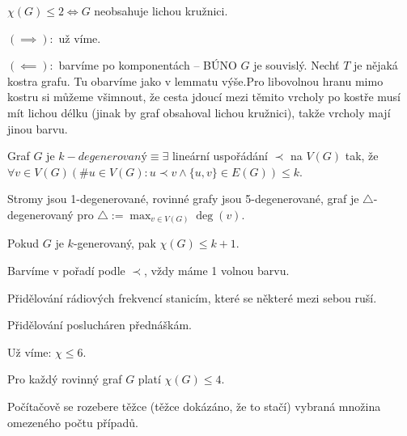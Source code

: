 \documentclass[12pt]{article}					%
\begin{document}
        \begin{veta}
            $\chi(G)≤2 \Leftrightarrow G$ neobsahuje lichou kružnici.
            \begin{dukazin}
                $(\implies):$ už víme.

                $(\impliedby):$ barvíme po komponentách -- BÚNO $G$ je souvislý. Nechť $T$ je nějaká kostra grafu. Tu obarvíme jako v lemmatu výše.Pro libovolnou hranu mimo kostru si můžeme všimnout, že cesta jdoucí mezi těmito vrcholy po kostře musí mít lichou délku (jinak by graf obsahoval lichou kružnici), takže vrcholy mají jinou barvu.
            \end{dukazin}
        \end{veta}

        \begin{definice}[Degenerovanost]
            Graf $G$ je $k-degenerovaný ≡ \exists$ lineární uspořádání $\prec$ na $V(G)$ tak, že $\forall v \in V(G) (\#u\in V(G): u \prec v \land \{u, v\} \in E(G)) ≤ k$.
        \end{definice}

        \begin{priklady}
                Stromy jsou 1-degenerované, rovinné grafy jsou 5-degenerované, graf je $\triangle$-degenerovaný pro $\triangle := \max_{v \in V(G)} \deg(v)$.
        \end{priklady}

        \begin{veta}[Větička]
            Pokud $G$ je $k$-generovaný, pak $\chi(G) ≤ k+1$.
            \begin{dukazin}
                Barvíme v pořadí podle $\prec$, vždy máme 1 volnou barvu.
            \end{dukazin}
        \end{veta}

        \begin{priklady}[Využití]
            Přidělování rádiových frekvencí stanicím, které se některé mezi sebou ruší.

            Přidělování poslucháren přednáškám.
        \end{priklady}

        \begin{poznamka}
            Už víme: $\chi ≤ 6$.
            \begin{vetain}[o 4 barvách]
                Pro každý rovinný graf $G$ platí $\chi(G) ≤ 4$.

                \begin{dukazin}
                    Počítačově se rozebere těžce (těžce dokázáno, že to stačí) vybraná množina omezeného počtu případů.
                \end{dukazin}
            \end{vetain}
        \end{poznamka}
\end{document}
